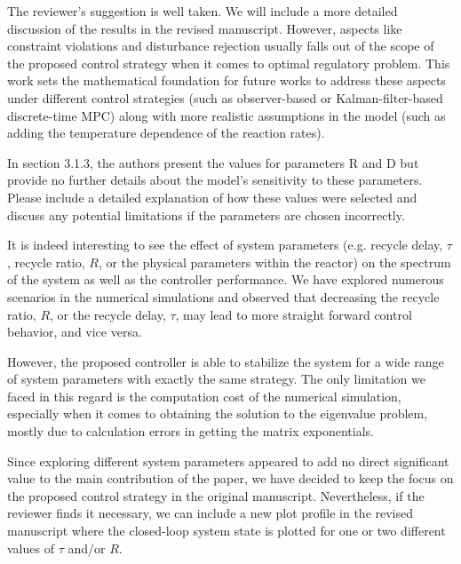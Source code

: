 \documentclass[12pt,answers]{exam}
\begin{document}
\begin{questions}
    \begin{solutionorbox}
        The reviewer's suggestion is well taken. We will include a more detailed discussion of the results in the revised manuscript. However, aspects like constraint violations and disturbance rejection usually falls out of the scope of the proposed control strategy when it comes to optimal regulatory problem. This work sets the mathematical foundation for future works to address these aspects under different control strategies (such as observer-based or Kalman-filter-based discrete-time MPC) along with more realistic assumptions in the model (such as adding the temperature dependence of the reaction rates).
    \end{solutionorbox}


    \question In section 3.1.3, the authors present the values for parameters R and D but provide no further details about the model's sensitivity to these parameters. Please include a detailed explanation of how these values were selected and discuss any potential limitations if the parameters are chosen incorrectly.

    \begin{solutionorbox}
        It is indeed interesting to see the effect of system parameters (e.g. recycle delay, $\tau$, recycle ratio, $R$, or the physical parameters within the reactor) on the spectrum of the system as well as the controller performance. We have explored numerous scenarios in the numerical simulations and observed that decreasing the recycle ratio, $R$, or the recycle delay, $\tau$, may lead to more straight forward control behavior, and vice versa. 
        
        However, the proposed controller is able to stabilize the system for a wide range of system parameters with exactly the same strategy. The only limitation we faced in this regard is the computation cost of the numerical simulation, especially when it comes to obtaining the solution to the eigenvalue problem, mostly due to calculation errors in getting the matrix exponentials.

        Since exploring different system parameters appeared to add no direct significant value to the main contribution of the paper, we have decided to keep the focus on the proposed control strategy in the original manuscript. Nevertheless, if the reviewer finds it necessary, we can include a new plot profile in the revised manuscript where the closed-loop system state is plotted for one or two different values of $\tau$ and/or $R$.
    \end{solutionorbox}



\end{questions}
\end{document}
